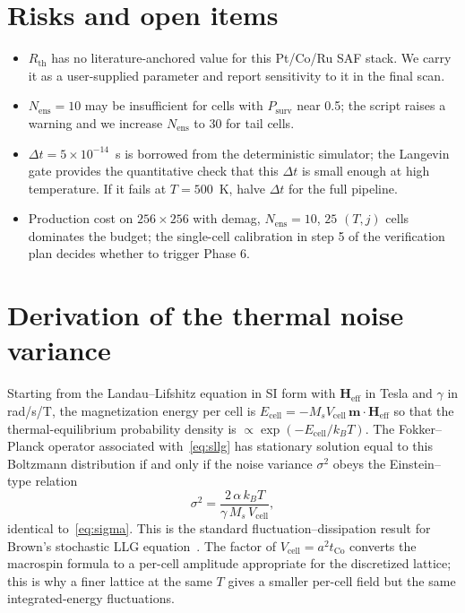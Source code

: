 \documentclass[11pt,a4paper]{article}
\newcommand{\mb}[1]{\mathbf{#1}}
\newcommand{\Heff}{\mb{H}_{\text{eff}}}
\newcommand{\Ms}{M_s}
\newcommand{\Vcell}{V_{\text{cell}}}
\newcommand{\tCo}{t_{\text{Co}}}
\newcommand{\Rth}{R_{\text{th}}}
\newcommand{\jcur}{j}
\newcommand{\kB}{k_B}
\begin{document}
\section{Risks and open items}

\begin{itemize}[leftmargin=2em]
    \item $\Rth$ has no literature-anchored value for this Pt/Co/Ru
    SAF stack. We carry it as a user-supplied parameter and report
    sensitivity to it in the final scan.
    \item $N_{\text{ens}} = 10$ may be insufficient for cells with
    $P_{\text{surv}}$ near 0.5; the script raises a warning and we
    increase $N_{\text{ens}}$ to 30 for tail cells.
    \item $\Delta t = 5\times 10^{-14}$~s is borrowed from the
    deterministic simulator; the Langevin gate provides the
    quantitative check that this $\Delta t$ is small enough at high
    temperature. If it fails at $T = 500$~K, halve $\Delta t$ for the
    full pipeline.
    \item Production cost on $256 \times 256$ with demag, $N_{\text{ens}}
    = 10$, $25$ $(T, \jcur)$ cells dominates the budget; the
    single-cell calibration in step 5 of the verification plan
    decides whether to trigger Phase 6.
\end{itemize}

\appendix
\section{Derivation of the thermal noise variance}\label{app:fdt}

Starting from the Landau--Lifshitz equation in SI form with
$\Heff$ in Tesla and $\gamma$ in rad/s/T, the magnetization energy
per cell is $E_{\text{cell}} = -\Ms \Vcell \, \mb{m} \cdot \Heff$ so
that the thermal-equilibrium probability density is
$\propto \exp(-E_{\text{cell}}/\kB T)$. The Fokker--Planck operator
associated with~\eqref{eq:sllg} has stationary solution equal to this
Boltzmann distribution if and only if the noise variance
$\sigma^2$ obeys the Einstein--type relation
%
\begin{equation}
\sigma^2 = \frac{2\, \alpha\, \kB T}{\gamma\, \Ms\, \Vcell},
\end{equation}
%
identical to~\eqref{eq:sigma}. This is the standard
fluctuation--dissipation result for Brown's stochastic LLG
equation~\cite{brown1963,garcia1998}. The factor of $\Vcell = a^2
\tCo$ converts the macrospin formula to a per-cell amplitude
appropriate for the discretized lattice; this is why a finer lattice
at the same $T$ gives a smaller per-cell field but the same
integrated-energy fluctuations.
\end{document}
